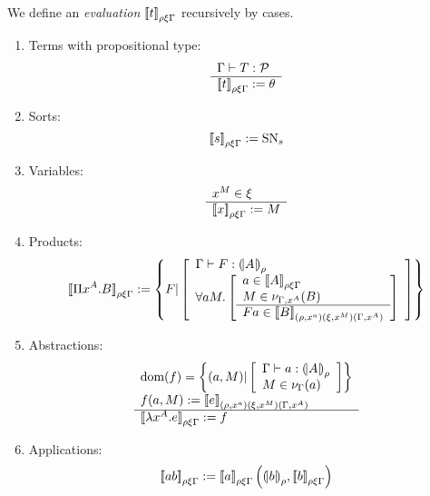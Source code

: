 \begin{definition}
    We define an \emph{evaluation} ${{{[\![} t {]\!]}}_{\rho\xi\Gamma}}$ recursively by
    cases.

    \def\evals#1{{\eval {#1} \rho \xi \Gamma}}

    \begin{enumerate}
    \item
        Terms with propositional type:
        $$
        \rulev{
            \Gamma \vdash T : \Prop
        }
        {
            \evals t := \nothing
        }
        $$

    \item Sorts:
        $$
        \evals s := \SN_s
        $$

    \item Variables:
        $$
        \rulev{x^M \in \xi}{\evals x := M}
        $$

    \item Products:
        $$
        \evals {\Pi x^A. B} :=
        \set{
            F |
            \bracklist{
                \Gamma \vdash F : \subst A \rho
                \\
                \ruleall {a M} {
                    a \in \evals A
                    \\
                    M \in \valset {\Gamma,x^A} B
                }
                {
                    F a \in
                    \eval B {(\rho, x^a)} {(\xi, x^M)} {(\Gamma, x^A)}
                }
            }
        }
        $$

    \item Abstractions:
        $$
        \rulev{
            \dom f =
            \set{
                (a,M) |
                \bracklist{
                    \Gamma \vdash a : \subst A \rho
                    \\
                    M \in \valset \Gamma a
                }
            }
            \\
            f(a,M) := \eval e {(\rho,x^a)} {(\xi,x^M)} {(\Gamma,x^A)}
        }
        {
            \evals{\lambda x^A. e} := f
        }
        $$

    \item Applications:
        $$
        \evals {a b} := \evals a \left( \subst b \rho, \evals b \right)
        $$
    \end{enumerate}

\end{definition}




